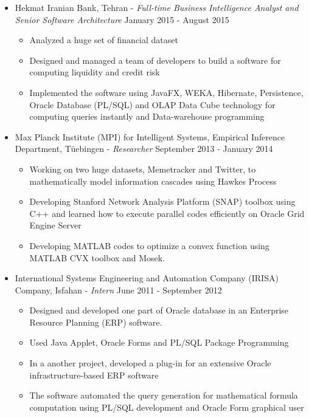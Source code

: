 \documentclass[letter]{res}
\begin{document}
\begin{resume}
\begin{itemize}
  \item Hekmat Iranian Bank, Tehran \newline
   - {\sl Full-time Business Intelligence Analyst and Senior Software Architecture} \hfill January 2015 - August 2015\\
  \vspace{-4mm}
  \iflong
    \begin{itemize}
        \item Analyzed a huge set of financial dataset
        \item Designed and managed a team of developers to build a software for computing liquidity and credit risk
        \item Implemented the software using JavaFX, WEKA, Hibernate, Persistence, Oracle Database (PL/SQL) and OLAP Data Cube technology for computing queries instantly and Data-warehouse programming
    \end{itemize}
  \fi
  
  \item Max Planck Institute (MPI) for Intelligent Systems, Empirical Inference Department, Tüebingen \newline
  - {\sl Researcher} \hfill September 2013 - January 2014\\
    \vspace{-4mm}
    \iflong
      \begin{itemize}
          \item Working on two huge datasets, Memetracker and Twitter, to mathematically model information cascades using Hawkes Process
          \item Developing Stanford Network Analysis Platform (SNAP) toolbox using C++ and learned how to execute parallel codes efficiently on Oracle Grid Engine Server
          \item Developing MATLAB codes to optimize a convex function using MATLAB CVX toolbox and Mosek.
      \end{itemize}
    \fi
  
  \item International Systems Engineering and Automation Company (IRISA) Company, Isfahan \newline
- {\sl Intern} \hfill June 2011 - September 2012\\
	\vspace{-4mm}
    \iflong
      \begin{itemize}
          \item Designed and developed one part of Oracle database in an Enterprise Resource Planning (ERP) software.
          \item Used Java Applet, Oracle Forms and PL/SQL Package Programming
          \item In a another project, developed a plug-in for an extensive Oracle infrastructure-based ERP software
          \item The software automated the query generation for mathematical formula computation using PL/SQL development and Oracle Form graphical user
      \end{itemize}
    \fi


\end{itemize}
\end{resume}
\end{document}
